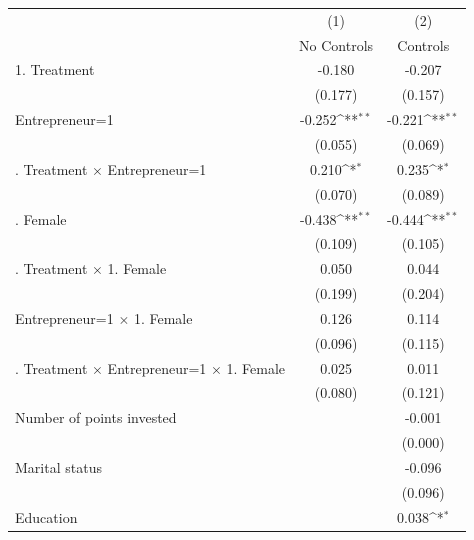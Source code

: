 {
\def\sym#1{\ifmmode^{#1}\else\(^{#1}\)\fi}
\begin{tabular}{l*{2}{c}}
\toprule
                    &\multicolumn{1}{c}{(1)}&\multicolumn{1}{c}{(2)}\\
                    &\multicolumn{1}{c}{No Controls}&\multicolumn{1}{c}{Controls}\\
\midrule
1. Treatment        &      -0.180         &      -0.207         \\
                    &     (0.177)         &     (0.157)         \\
\addlinespace
Entrepreneur=1      &      -0.252\sym{**} &      -0.221\sym{**} \\
                    &     (0.055)         &     (0.069)         \\
\addlinespace
1. Treatment $\times$ Entrepreneur=1&       0.210\sym{*}  &       0.235\sym{*}  \\
                    &     (0.070)         &     (0.089)         \\
\addlinespace
1. Female           &      -0.438\sym{**} &      -0.444\sym{**} \\
                    &     (0.109)         &     (0.105)         \\
\addlinespace
1. Treatment $\times$ 1. Female&       0.050         &       0.044         \\
                    &     (0.199)         &     (0.204)         \\
\addlinespace
Entrepreneur=1 $\times$ 1. Female&       0.126         &       0.114         \\
                    &     (0.096)         &     (0.115)         \\
\addlinespace
1. Treatment $\times$ Entrepreneur=1 $\times$ 1. Female&       0.025         &       0.011         \\
                    &     (0.080)         &     (0.121)         \\
\addlinespace
Number of points invested&                     &      -0.001         \\
                    &                     &     (0.000)         \\
\addlinespace
Marital status      &                     &      -0.096         \\
                    &                     &     (0.096)         \\
\addlinespace
Education           &                     &       0.038\sym{*}  \\

\end{tabular}}
